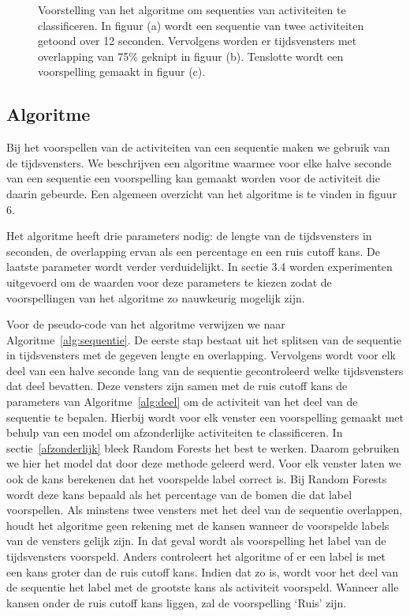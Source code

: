 \documentclass{article}
\begin{document}
\begin{figure}
\begin{subfigure}[b]{.90\linewidth}
\end{subfigure}
  \caption{Voorstelling van het algoritme om sequenties van activiteiten te classificeren. In figuur (a) wordt een sequentie van twee activiteiten getoond over 12 seconden. Vervolgens worden er tijdsvensters met overlapping van 75\% geknipt in figuur (b). Tenslotte wordt een voorspelling gemaakt in figuur (c).}\label{fig:algoritme}

\end{figure}

\subsection{Algoritme}

Bij het voorspellen van de activiteiten van een sequentie maken we gebruik van de tijdsvensters. We beschrijven een algoritme waarmee voor elke halve seconde van een sequentie een voorspelling kan gemaakt worden voor de activiteit die daarin gebeurde. Een algemeen overzicht van het algoritme is te vinden in figuur 6.

Het algoritme heeft drie parameters nodig: de lengte van de tijdsvensters in seconden, de overlapping ervan als een percentage en een ruis cutoff kans. De laatste parameter wordt verder verduidelijkt. In sectie 3.4 worden experimenten uitgevoerd om de waarden voor deze parameters te kiezen zodat de voorspellingen van het algoritme zo nauwkeurig mogelijk zijn.

Voor de pseudo-code van het algoritme verwijzen we naar Algoritme~\ref{alg:sequentie}. De eerste stap bestaat uit het splitsen van de sequentie in tijdsvensters met de gegeven lengte en overlapping. Vervolgens wordt voor elk deel van een halve seconde lang van de sequentie gecontroleerd welke tijdsvensters dat deel bevatten. Deze vensters zijn samen met de ruis cutoff kans de parameters van Algoritme~\ref{alg:deel} om de activiteit van het deel van de sequentie te bepalen. Hierbij wordt voor elk venster een voorspelling gemaakt met behulp van een model om afzonderlijke activiteiten te classificeren. In sectie~\ref{afzonderlijk} bleek Random Forests het best te werken. Daarom gebruiken we hier het model dat door deze methode geleerd werd. Voor elk venster laten we ook de kans berekenen dat het voorspelde label correct is. Bij Random Forests wordt deze kans bepaald als het percentage van de bomen die dat label voorspellen. %
Als minstens twee vensters met het deel van de sequentie overlappen, houdt het algoritme geen rekening met de kansen wanneer de voorspelde labels van de vensters gelijk zijn. In dat geval wordt als voorspelling het label van de tijdsvensters voorspeld. Anders controleert het algoritme of er een label is met een kans groter dan de ruis cutoff kans. Indien dat zo is, wordt voor het deel van de sequentie het label met de grootste kans als activiteit voorspeld. Wanneer alle kansen onder de ruis cutoff kans liggen, zal de voorspelling `Ruis' zijn.
\end{document}
